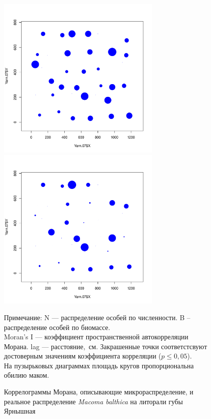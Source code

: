 \begin{figure}[h]
	\begin{minipage}[b]{.46\linewidth}
	\begin{center}
		\includegraphics[width=80mm]{../Barenc_Sea/distribution_Moran/Yarnyshnaya_N_Macoma_bubbles.pdf}
	\end{center}
	\end{minipage}
	\hfil %
	\begin{minipage}[b]{.46\linewidth}
	\begin{center}
		\includegraphics[width=80mm]{../Barenc_Sea/distribution_Moran/Yarnyshnaya_B_Macoma_bubbles.pdf}
	\end{center}
	\end{minipage}
	\caption{Коррелограммы Морана, описывающие микрораспределение, и реальное распределение {\it Macoma balthica} на литорали губы Ярнышная}
	\label{ris:MoranI_Yarnyshnaya}

	\footnotesize{Примечание: N --- распределение особей по численности. B -- распределение особей по биомассе.\\
	Moran's I --- коэффициент пространственной автокорреляции Морана. lag --- расстояние,~см. Закрашенные точки соответстсвуют достоверным значениям коэффициента корреляции ($p \le 0,05$).\\
	На пузырьковых диаграммах площадь кругов пропорциональна обилию маком.}
	\end{figure}



